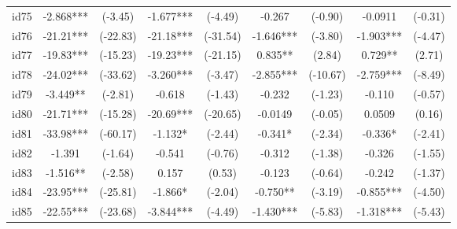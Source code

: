 \documentclass[entropy,article,submit,moreauthors,LaTeX and dvi2pdf]{Definitions/mdpi}
\begin{document}
\begin{center}
\begin{longtable}{ccccccccc}
id75                                          & -2.868***     & (-3.45)       & -1.677***       & (-4.49)          & -0.267            & (-0.90)           & -0.0911           & (-0.31)           \\
id76                                          & -21.21***     & (-22.83)      & -21.18***       & (-31.54)         & -1.646***         & (-3.80)           & -1.903***         & (-4.47)           \\
id77                                          & -19.83***     & (-15.23)      & -19.23***       & (-21.15)         & 0.835**           & (2.84)            & 0.729**           & (2.71)            \\
id78                                          & -24.02***     & (-33.62)      & -3.260***       & (-3.47)          & -2.855***         & (-10.67)          & -2.759***         & (-8.49)           \\
id79                                          & -3.449**      & (-2.81)       & -0.618          & (-1.43)          & -0.232            & (-1.23)           & -0.110            & (-0.57)           \\
id80                                          & -21.71***     & (-15.28)      & -20.69***       & (-20.65)         & -0.0149           & (-0.05)           & 0.0509            & (0.16)            \\
id81                                          & -33.98***     & (-60.17)      & -1.132*         & (-2.44)          & -0.341*           & (-2.34)           & -0.336*           & (-2.41)           \\
id82                                          & -1.391        & (-1.64)       & -0.541          & (-0.76)          & -0.312            & (-1.38)           & -0.326            & (-1.55)           \\
id83                                          & -1.516**      & (-2.58)       & 0.157           & (0.53)           & -0.123            & (-0.64)           & -0.242            & (-1.37)           \\
id84                                          & -23.95***     & (-25.81)      & -1.866*         & (-2.04)          & -0.750**          & (-3.19)           & -0.855***         & (-4.50)           \\
id85                                          & -22.55***     & (-23.68)      & -3.844***       & (-4.49)          & -1.430***         & (-5.83)           & -1.318***         & (-5.43)           \\

\end{longtable}
\end{center}
\end{document}
